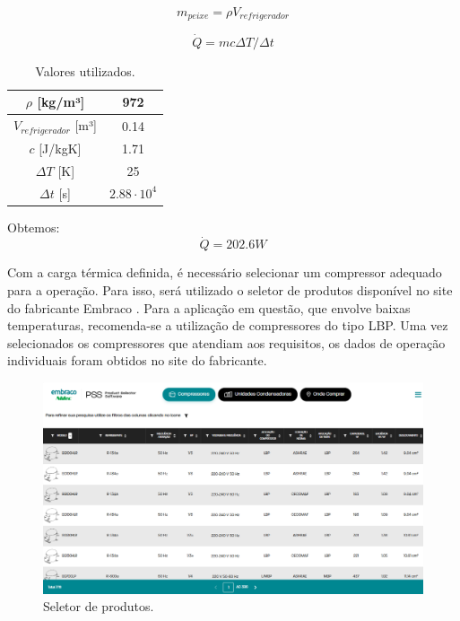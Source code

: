 \begin{equation}
    m_{peixe} = \rho V_{refrigerador}
    \label{massa peixe}
\end{equation}

\begin{equation}
    \dot{Q} = m c \Delta T / \Delta t
    \label{Q resfriamento}
\end{equation}


\begin{table}[ht]
\centering
\begin{tabular}{|c|c|}
\hline
$\rho$ {[}kg/m³{]} & 972 \\ \hline
$V_{refrigerador}$ {[}m³{]}     & 0.14 \\ \hline
$c$ {[}J/kgK{]}     &  1.71 \\ \hline
$\Delta T$ {[}K{]}     &  25 \\ \hline
$\Delta t$ {[}s{]}     &  $2.88 \cdot10^{4}$ \\ \hline
\end{tabular}
\caption{Valores utilizados.}
\label{tab:tabela dados}
\end{table}

Obtemos:
\begin{equation}
    \dot{Q} = 202.6 W
    \label{carga}
\end{equation}

Com a carga térmica definida, é necessário selecionar um compressor adequado para a operação. Para isso, será utilizado o seletor de produtos disponível no site do fabricante Embraco \textcopyright. Para a aplicação em questão, que envolve baixas temperaturas, recomenda-se a utilização de compressores do tipo LBP. Uma vez selecionados os compressores que atendiam aos requisitos, os dados de operação individuais foram obtidos no site do fabricante.

\begin{figure}
    \centering
    \includegraphics[width=0.8\linewidth]{Imagens/Desenvolvimento/PSS-embraco.png}
    \caption{Seletor de produtos.}
    \label{fig:seletor de produtos}
\end{figure}


